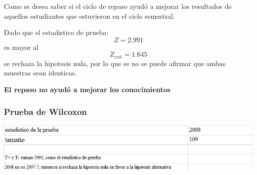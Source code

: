 \begin{frame}

    Como se desea saber si el ciclo de repaso ayudó a mejorar los resultados 
    de aquellos estudiantes que estuvieron en el ciclo semestral.

    Dado que el estadistico de prueba: \[ Z = 2.991 \] es mayor al 
    \[Z_{crit} = 1.645\] se rechaza la hipotesis nula, por lo que se no
    se puede afirmar que ambas muestras sean identicas.

    \textbf{El repaso no ayudó a mejorar los conocimientos}
\end{frame}

\begin{frame}
    \frametitle{Prueba de Wilcoxon}
    \includegraphics[width=1\textwidth]{cap/images/wilcoxon/resultados.jpg}
\end{frame}